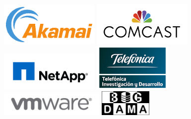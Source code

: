 \documentclass[12pt]{article}
\begin{document}
\begin{center}
\includegraphics[width=1.9in]{akamai.png}
\hspace{0.2in}
\includegraphics[width=1.9in]{comcast.jpg}
\hspace{0.2in}
\includegraphics[width=1.9in]{netapp.jpeg}
\hspace{0.2in}
\includegraphics[width=1.5in]{telefonica.png}
\hspace{0.2in}
\includegraphics[width=2in]{vmware.jpg}
\hspace{0.2in}
\includegraphics[width=1in]{bigdama.jpg}
\hspace{0.2in}

\end{center}
\end{document}
